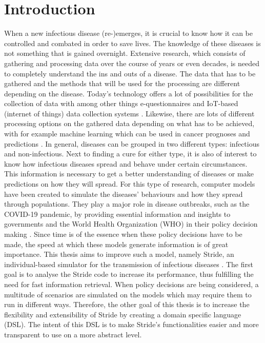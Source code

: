 \chapter{Introduction}
When a new infectious disease (re-)emerges, it is crucial to know how it can be controlled and combated in order to save lives. The knowledge of these diseases is not something that is gained overnight. Extensive research, which consists of gathering and processing data over the course of years or even decades, is needed to completely understand the ins and outs of a disease. The data that has to be gathered and the methods that will be used for the processing are different depending on the disease. Today's technology offers a lot of possibilities for the collection of data with among other things e-questionnaires \cite{e-questionnaire} and IoT-based (internet of things) data collection systems \cite{iot_data_collection}. Likewise, there are lots of different processing options on the gathered data depending on what has to be achieved, with for example machine learning which can be used in cancer prognoses and predictions \cite{ml_cancer}. In general, diseases can be grouped in two different types: infectious and non-infectious. Next to finding a cure for either type, it is also of interest to know how infectious diseases spread and behave under certain circumstances. This information is necessary to get a better understanding of diseases or make predictions on how they will spread. For this type of research, computer models have been created to simulate the diseases' behaviours and how they spread through populations. They play a major role in disease outbreaks, such as the COVID-19 pandemic, by providing essential information and insights to governments and the World Health Organization (WHO) in their policy decision making \cite{modelling_importance}. Since time is of the essence when these policy decisions have to be made, the speed at which these models generate information is of great importance. This thesis aims to improve such a model, namely Stride, an individual-based simulator for the transmission of infectious diseases \cite{stride}. The first goal is to analyse the Stride code to increase its performance, thus fulfilling the need for fast information retrieval. When policy decisions are being considered, a multitude of scenarios are simulated on the models which may require them to run in different ways. Therefore, the other goal of this thesis is to increase the flexibility and extensibility of Stride by creating a domain specific language (DSL). The intent of this DSL is to make Stride's functionalities easier and more transparent to use on a more abstract level.
